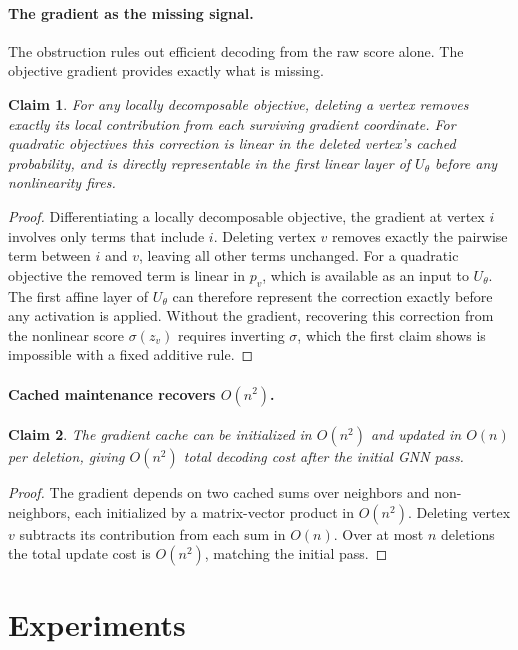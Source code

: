 \documentclass[11pt]{article}
\theoremstyle{plain}
\theoremstyle{remark}
\theoremstyle{plain}
\newtheorem{claim}{Claim}[section]
\begin{document}
\paragraph{The gradient as the missing signal.}
The obstruction rules out efficient decoding from the raw score alone. The objective
gradient provides exactly what is missing.

\begin{claim}
  For any locally decomposable objective, deleting a vertex removes exactly its local
  contribution from each surviving gradient coordinate. For quadratic objectives this
  correction is linear in the deleted vertex's cached probability, and is directly
  representable in the first linear layer of $U_\theta$ before any nonlinearity fires.
\end{claim}
\begin{proof}
  Differentiating a locally decomposable objective, the gradient at vertex $i$
  involves only terms that include $i$. Deleting vertex $v$ removes exactly the
  pairwise term between $i$ and $v$, leaving all other terms unchanged. For a
  quadratic objective the removed term is linear in $p_v$, which is available as
  an input to $U_\theta$. The first affine layer of $U_\theta$ can therefore
  represent the correction exactly before any activation is applied. Without the
  gradient, recovering this correction from the nonlinear score $\sigma(z_v)$
  requires inverting $\sigma$, which the first claim shows is impossible with a
  fixed additive rule.
\end{proof}

\paragraph{Cached maintenance recovers $O(n^2)$.}

\begin{claim}
  The gradient cache can be initialized in $O(n^2)$ and updated in $O(n)$ per
  deletion, giving $O(n^2)$ total decoding cost after the initial GNN pass.
\end{claim}
\begin{proof}
  The gradient depends on two cached sums over neighbors and non-neighbors,
  each initialized by a matrix-vector product in $O(n^2)$. Deleting vertex $v$
  subtracts its contribution from each sum in $O(n)$. Over at most $n$ deletions
  the total update cost is $O(n^2)$, matching the initial pass.
\end{proof}


\section{Experiments}
\label{sec:experiments}
\end{document}
